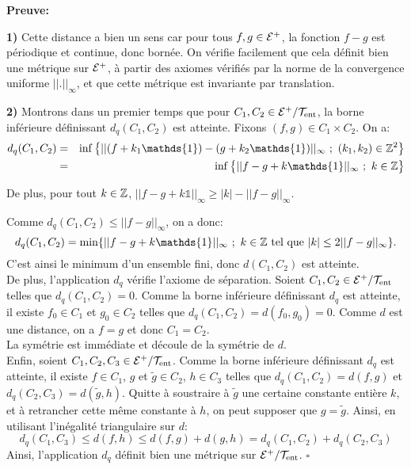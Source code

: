 	\textbf{Preuve:}
	\par\textbf{1)} Cette distance a bien un sens car pour tous $f,g \in {\mathcal{E}}^+$, la fonction $f-g$ est périodique et continue, donc bornée. On vérifie facilement que cela définit bien une métrique sur ${\mathcal{E}}^+$, à partir des axiomes vérifiés par la norme de la convergence uniforme $||.||_{\infty}$, et que cette métrique est invariante par translation.\\

	\par\textbf{2)} Montrons dans un premier temps que pour $C_1, C_2 \in \mathcal{E}^+/\mathcal{T}_{\mathrm{ent}}$, la borne inférieure définissant $d_q(C_1,C_2)$ est atteinte. Fixons $(f,g) \in C_1 \times C_2$. On a:
		\begin{eqnarray*}
		d_q(C_1,C_2)&=&\inf\big\lbrace ||(f+k_1\mathds{1})-(g+k_2\mathds{1})||_\infty\ ;\ (k_1,k_2)\in \Zbb^2\big\rbrace\\
		&=&\inf \big\lbrace ||f-g+k\mathds{1}||_\infty\ ;\ k \in \Zbb\big\rbrace
	\end{eqnarray*}


	De plus, pour  tout $k \in {\mathbb{Z}}$, $||f-g +k\mathds{1}||_\infty\geq |k|-||f-g||_\infty$.

	Comme $d_q(C_1,C_2)\leq ||f-g||_\infty$, on a donc:
	$$d_q(C_1,C_2)= \min \lbrace ||f-g+k\mathds{1}||_\infty\ ;\ k \in \Zbb \text{ tel que } |k|\leq 2||f-g||_\infty\rbrace.$$
	C'est ainsi le minimum d'un ensemble fini, donc $d(C_1,C_2)$ est atteinte.\\

	De plus, l'application $d_q$ vérifie l'axiome de séparation. Soient $C_1, C_2 \in \mathcal{E}^+/\mathcal{T}_{\mathrm{ent}}$ telles que $d_q(C_1,C_2) = 0$. Comme la borne inférieure définissant $d_q$ est atteinte, il existe $f_0 \in C_1$ et $g_0 \in C_2$ telles que $d_q(C_1,C_2)=d(f_0,g_0)=0$. Comme $d$ est une distance, on a $f=g$ et donc $C_1 = C_2$.\\

	La symétrie est immédiate et découle de la symétrie de $d$.\\

	Enfin, soient $C_1, C_2, C_3 \in \mathcal{E}^+/\mathcal{T}_{\mathrm{ent}}$. Comme la borne inférieure définissant $d_q$ est atteinte, il existe $f\in C_1$, $g$ et $\widetilde{g} \in C_2$, $h \in C_3$ telles que $d_q(C_1,C_2)=d(f,g)$ et $d_q(C_2,C_3)=d(\widetilde{g},h)$. Quitte à soustraire à $\widetilde{g}$ une certaine constante entière $k$, et à retrancher cette même constante à $h$, on peut supposer que $g=\widetilde{g}$. Ainsi, en utilisant l'inégalité triangulaire sur $d$:
	$$d_q(C_1,C_3)\leq d(f,h) \leq d(f,g)+d(g,h)= d_q(C_1,C_2)+d_q(C_2,C_3)$$
	Ainsi, l'application $d_q$ définit bien une métrique sur $\mathcal{E}^+/\mathcal{T}_{\mathrm{ent}}$. \hfill $\square$\\











